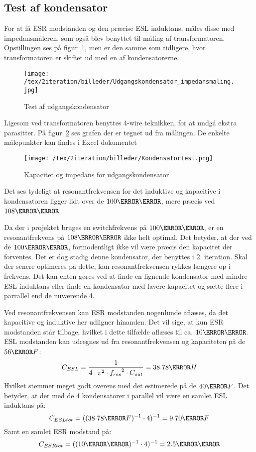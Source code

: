 \subsection{Test af kondensator}

For at få ESR modstanden og den præcise ESL induktans, måles disse med impedansmåleren, som også blev benyttet til måling af transformatoren. Opstillingen ses på figur~\ref{fig: cap}, men er den samme som tidligere, hvor transformatoren er skiftet ud med en af kondensatorerne. 
\begin{figure}[H]
	\center
	\texttt{[image: /tex/2iteration/billeder/Udgangskondensator\_impedansmaling.jpg]}
	\caption{Test af udgangskondensator}
	\label{fig: cap}
\end{figure}
Ligesom ved transformatoren benyttes 4-wire teknikken, for at undgå ekstra parasitter. På figur~\ref{fig: captest} ses grafen der er tegnet ud fra målingen. De enkelte målepunkter kan findes i Excel dokumentet \cite{Kondensator_impedans.xlsx}
\begin{figure}[H]
	\center
	\texttt{[image: /tex/2iteration/billeder/Kondensatortest.png]}
	\caption{Kapacitet og impedans for udgangskondensator}
	\label{fig: captest}
\end{figure}
Det ses tydeligt at resonantfrekvensen for det induktive og kapacitive i kondensatoren ligger lidt over de $100\kilo \hertz$, mere præcis ved $108\kilo \hertz$. 


\noindent Da der i projektet bruges en switchfrekvens på $100\kilo \hertz$, er en resonantfrekvens på $108\kilo \hertz$ ikke helt optimal. Det betyder, at der ved de $100\kilo \hertz$, formodentligt ikke vil være præcis den kapacitet der forventes. Det er dog stadig denne kondensator, der benyttes i 2. iteration. Skal der senere optimeres på dette, kan resonantfrekvensen rykkes længere op i frekvens. Det kan enten gøres ved at finde en lignende kondensator med mindre ESL induktans eller finde en kondensator med lavere kapacitet og sætte flere i parrallel end de nuværende 4.


\noindent Ved resonantfrekvensen kan ESR modstanden nogenlunde aflæses, da det kapacitive og induktive her udligner hinanden. Det vil sige, at kun ESR modstanden står tilbage, hvilket i dette tilfælde aflæses til ca. $10\milli \ohm$. 
ESL modstanden kan udregnes ud fra resonantfrekvensen og kapaciteten på de $56\micro F$:
\begin{equation} \label{CESL}
C_{ESL} = \frac{1}{4 \cdot \pi^{2} \cdot {f_{res}}^{2} \cdot C_{out}} = 38.78\nano H
\end{equation}
Hvilket stemmer meget godt overens med det estimerede på de $40\nano F$.
Det betyder, at der med de 4 kondensatorer i parallel vil være en samlet ESL induktans på: 
\begin{equation} \label{CESLtot}
C_{ESLtot} = ((38.78\nano F)^{-1} \cdot 4)^{-1} = 9.70\nano F
\end{equation}
Samt en samlet ESR modstand på:
\begin{equation} \label{CSRtot}
C_{ESRtot} = ((10\milli \ohm)^{-1} \cdot 4)^{-1} = 2.5\milli \ohm
\end{equation}


